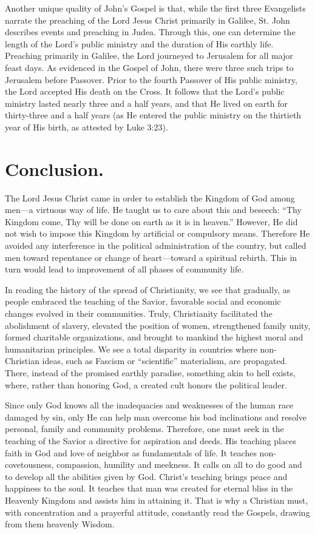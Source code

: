 Another unique quality of John's Gospel is that, while the first three Evangelists narrate the preaching of the Lord Jesus Christ primarily in Galilee, St. John describes events and preaching in Judea. Through this, one can determine the length of the Lord's public ministry and the duration of His earthly life. Preaching primarily in Galilee, the Lord journeyed to Jerusalem for all major feast days. As evidenced in the Gospel of John, there were three such trips to Jerusalem before Passover. Prior to the fourth Passover of His public ministry, the Lord accepted His death on the Cross. It follows that the Lord's public ministry lasted nearly three and a half years, and that He lived on earth for thirty-three and a half years (as He entered the public ministry on the thirtieth year of His birth, as attested by Luke 3:23).

\section{Conclusion.}

The Lord Jesus Christ came in order to establish the Kingdom of God among men---a virtuous way of life. He taught us to care about this and beseech: ``Thy Kingdom come, Thy will be done on earth as it is in heaven.'' However, He did not wish to impose this Kingdom by artificial or compulsory means. Therefore He avoided any interference in the political administration of the country, but called men toward repentance or change of heart---toward a spiritual rebirth. This in turn would lead to improvement of all phases of community life.

In reading the history of the spread of Christianity, we see that gradually, as people embraced the teaching of the Savior, favorable social and economic changes evolved in their communities. Truly, Christianity facilitated the abolishment of slavery, elevated the position of women, strengthened family unity, formed charitable organizations, and brought to mankind the highest moral and humanitarian principles. We see a total disparity in countries where non-Christian ideas, such as Fascism or ``scientific'' materialism, are propagated. There, instead of the promised earthly paradise, something akin to hell exists, where, rather than honoring God, a created cult honors the political leader.

Since only God knows all the inadequacies and weaknesses of the human race damaged by sin, only He can help man overcome his bad inclinations and resolve personal, family and community problems. Therefore, one must seek in the teaching of the Savior a directive for aspiration and deeds. His teaching places faith in God and love of neighbor as fundamentals of life. It teaches non-covetousness, compassion, humility and meekness. It calls on all to do good and to develop all the abilities given by God. Christ's teaching brings peace and happiness to the soul. It teaches that man was created for eternal bliss in the Heavenly Kingdom and assists him in attaining it. That is why a Christian must, with concentration and a prayerful attitude, constantly read the Gospels, drawing from them heavenly Wisdom.

